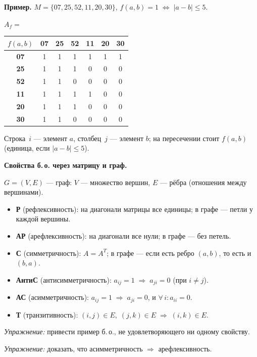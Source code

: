 \textbf{Пример.} $M = \{07, 25, 52, 11, 20, 30\}$,\;
$f(a,b) = 1 \;\Leftrightarrow\; |a - b| \leq 5$.

\begin{center}
\renewcommand{\arraystretch}{1.25}
$A_f=$\;
\begin{tabular}{|c||*{6}{c|}}
\hline
$f(a,b)$ & \textbf{07} & \textbf{25} & \textbf{52} & \textbf{11} & \textbf{20} & \textbf{30} \\ \hline\hline
\textbf{07} & 1 & 1 & 1 & 1 & 1 & 1 \\ \hline
\textbf{25} & 1 & 1 & 1 & 0 & 0 & 0 \\ \hline
\textbf{52} & 1 & 1 & 0 & 0 & 0 & 0 \\ \hline
\textbf{11} & 1 & 1 & 1 & 1 & 0 & 0 \\ \hline
\textbf{20} & 1 & 1 & 1 & 0 & 0 & 0 \\ \hline
\textbf{30} & 1 & 1 & 0 & 0 & 0 & 0 \\ \hline
\end{tabular}
\end{center}

\noindent\small Строка~$i$ --- элемент $a$, столбец~$j$ --- элемент $b$; на пересечении стоит
$f(a,b)$ (единица, если $|a-b|\leq 5$).\normalsize

\medskip
\textbf{Свойства б.\,о. через матрицу и граф.}

$G = (V, E)$ --- граф: $V$ --- множество вершин, $E$ --- рёбра (отношения между вершинами).

\begin{itemize}
  \item \textbf{Р} (рефлексивность): на диагонали матрицы все единицы;
        в графе --- петли у каждой вершины.
  \item \textbf{АР} (арефлексивность): на диагонали все нули;
        в графе --- без петель.
  \item \textbf{С} (симметричность): $A = A^T$;
        в графе --- если есть ребро $(a,b)$, то есть и $(b,a)$.
  \item \textbf{АнтиС} (антисимметричность): $a_{ij} = 1 \;\Rightarrow\; a_{ji} = 0$
        (при $i \neq j$).
  \item \textbf{АС} (асимметричность): $a_{ij} = 1 \;\Rightarrow\; a_{ji} = 0$,
        и $\forall\, i\colon a_{ii} = 0$.
  \item \textbf{Т} (транзитивность): $(i,j) \in E,\; (j,k) \in E
        \;\Rightarrow\; (i,k) \in E$.
\end{itemize}

\textit{Упражнение:} привести пример б.\,о., не удовлетворяющего ни одному свойству.

\textit{Упражнение:} доказать, что асимметричность $\Rightarrow$ арефлексивность.
